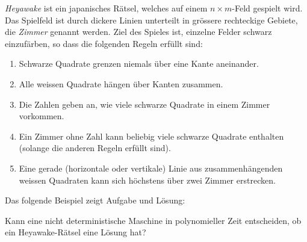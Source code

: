 {\em Heyawake} ist ein japanisches Rätsel, welches auf einem $n\times m$-Feld
gespielt wird. Das Spielfeld ist durch dickere Linien unterteilt in grössere rechteckige Gebiete, die {\it Zimmer} genannt werden. 
Ziel des Spieles ist, einzelne Felder schwarz einzufärben, so dass die
folgenden Regeln erfüllt sind:
\begin{enumerate}
\item
Schwarze Quadrate grenzen niemals über eine Kante aneinander.
\item
Alle weissen Quadrate hängen über Kanten zusammen.
\item
Die Zahlen geben an, wie viele schwarze Quadrate in einem Zimmer vorkommen.
\item
Ein Zimmer ohne Zahl kann beliebig viele schwarze Quadrate enthalten
(solange die anderen Regeln erfüllt sind).
\item
Eine gerade (horizontale oder vertikale) Linie aus zusammenhängenden
weissen Quadraten kann sich höchstens über zwei Zimmer erstrecken.
\end{enumerate}
Das folgende Beispiel zeigt Aufgabe und Lösung:
\begin{center}
\qquad
{}
\end{center}

Kann eine nicht deterministische Maschine in polynomieller Zeit entscheiden,
ob ein Heyawake-Rätsel eine Lösung hat?



